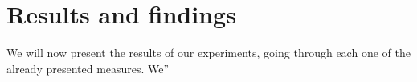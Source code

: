\section{Results and findings}
We will now present the results of our experiments, going through each one of the already presented measures.
We''
